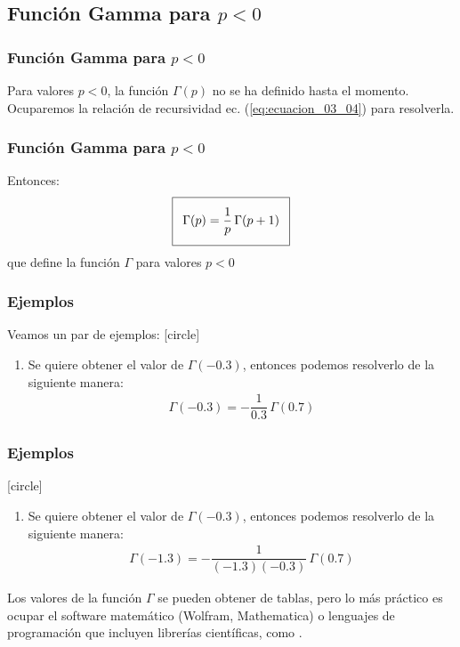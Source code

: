 \subsection{Función Gamma para \texorpdfstring{$p < 0$}{p < 0}}
\begin{frame}
\frametitle{Función Gamma para $p < 0$}
Para valores $p < 0$, la función $\Gamma (p)$ no se ha definido hasta el momento.
\\
\bigskip
\pause
Ocuparemos la relación de recursividad ec. (\ref{eq:ecuacion_03_04}) para resolverla.
\end{frame}
\begin{frame}
\frametitle{Función Gamma para $p < 0$}
Entonces:
\begin{align}
\addtolength{\fboxsep}{5pt}\boxed{
\Gamma (p) = \dfrac{1}{p} \, \Gamma (p + 1)}
\label{eq:ecuacion_04_01}
\end{align}
que define la función $\Gamma$ para valores $p < 0$
\end{frame}
\begin{frame}
\frametitle{Ejemplos}
Veamos un par de ejemplos: 
[circle]
\begin{enumerate}[<+->]
\item  Se quiere obtener el valor de $\Gamma (-0.3)$, entonces podemos resolverlo de la siguiente manera:
\begin{align*}
\Gamma (-0.3) = - \dfrac{1}{0.3} \, \Gamma (0.7)
\end{align*}
\seti
\end{enumerate}
\end{frame}
\begin{frame}
\frametitle{Ejemplos}
[circle]
\begin{enumerate}[<+->]
\conti
\item  Se quiere obtener el valor de $\Gamma (-0.3)$, entonces podemos resolverlo de la siguiente manera:
\begin{align*}
\Gamma (-1.3) = - \dfrac{1}{(-1.3)(-0.3)} \, \Gamma (0.7)
\end{align*}
\end{enumerate}
\fontsize{12}{12}\selectfont
Los valores de la función $\Gamma$ se pueden obtener de tablas, pero lo más práctico es ocupar el software matemático (Wolfram, Mathematica) o lenguajes de programación que incluyen librerías científicas, como \python.
\end{frame}
